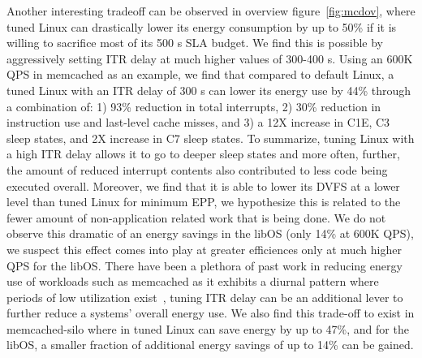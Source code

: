 
Another interesting tradeoff can be observed in overview figure~\ref{fig:mcdov}, where tuned Linux can drastically lower its energy consumption by up to 50\% if it is willing to sacrifice most of its 500 \micro s SLA budget. We find this is possible by aggressively setting ITR delay at much higher values of 300-400 \micro s. Using an 600K QPS in memcached as an example, we find that compared to default Linux, a tuned Linux with an ITR delay of 300 \micro s can lower its energy use by 44\% through a combination of: 1) 93\% reduction in total interrupts, 2) 30\% reduction in instruction use and last-level cache misses, and 3) a 12X increase in C1E, C3 sleep states, and 2X increase in C7 sleep states. To summarize, tuning Linux with a high ITR delay allows it to go to deeper sleep states and more often, further, the amount of reduced interrupt contents also contributed to less code being executed overall. Moreover, we find that it is able to lower its DVFS at a lower level than tuned Linux for minimum EPP, we hypothesize this is related to the fewer amount of non-application related work that is being done. We do not observe this dramatic of an energy savings in the libOS (only 14\% at 600K QPS), we suspect this effect comes into play at greater efficiences only at much higher QPS for the libOS. There have been a plethora of past work in reducing energy use of workloads such as memcached as it exhibits a diurnal pattern where periods of low utilization exist~\cite{hotpower2008, powernap, napsac}, tuning ITR delay can be an additional lever to further reduce a systems' overall energy use. We also find this trade-off to exist in memcached-silo where in tuned Linux can save energy by up to 47\%, and for the libOS, a smaller fraction of additional energy savings of up to 14\% can be gained.


